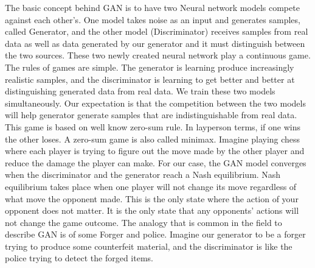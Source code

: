 \documentclass[12pt]{article}
\begin{document}
The basic concept behind GAN is to have two Neural network models compete against each other’s. One model takes noise as an input and generates samples, called Generator, and the other model (Discriminator) receives samples from real data as well as data generated by our generator and it must distinguish between the two sources. These two newly created neural network play a continuous game. The rules of games are simple. The generator is learning produce increasingly realistic samples, and the discriminator is learning to get better and better at distinguishing generated data from real data. We train these two models simultaneously. Our expectation is that the competition between the two models will help generator generate samples that are indistinguishable from real data. This game is based on well know zero-sum rule.  In layperson terms, if one wins the other loses. A zero-sum game is also called minimax. Imagine playing chess where each player is trying to figure out the move made by the other player and reduce the damage the player can make. For our case, the GAN model converges when the discriminator and the generator reach a Nash equilibrium. Nash equilibrium takes place when one player will not change its move regardless of what move the opponent made. This is the only state where the action of your opponent does not matter. It is the only state that any opponents’ actions will not change the game outcome.
The analogy that is common in the field to describe GAN is of some Forger and police. Imagine our generator to be a forger trying to produce some counterfeit material, and the discriminator is like the police trying to detect the forged items.\\
\end{document}
